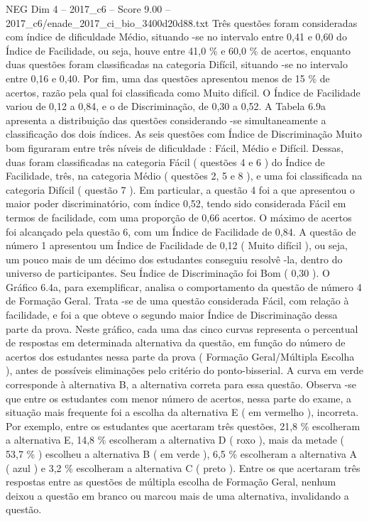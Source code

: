\begin{textsample}{NEG Dim 4 – 2017\_c6 – Score 9.00 – 2017\_c6/enade\_2017\_ci\_bio\_3400d20d88.txt}
Três questões foram consideradas com índice de dificuldade Médio, situando -se no intervalo entre 0,41 e 0,60 do Índice de Facilidade, ou seja, houve entre 41,0 \% e 60,0 \% de acertos, enquanto duas questões foram classificadas na categoria Difícil, situando -se no intervalo entre 0,16 e 0,40.
Por fim, uma das questões apresentou menos de 15 \% de acertos, razão pela qual foi classificada como Muito difícil.
O Índice de Facilidade variou de 0,12 a 0,84, e o de Discriminação, de 0,30 a 0,52.
A Tabela 6.9a apresenta a distribuição das questões considerando -se simultaneamente a classificação dos dois índices.
As seis questões com Índice de Discriminação Muito bom figuraram entre três níveis de dificuldade : Fácil, Médio e Difícil.
Dessas, duas foram classificadas na categoria Fácil ( questões 4 e 6 ) do Índice de Facilidade, três, na categoria Médio ( questões 2, 5 e 8 ), e uma foi classificada na categoria Difícil ( questão 7 ).
Em particular, a questão 4 foi a que apresentou o maior poder discriminatório, com índice 0,52, tendo sido considerada Fácil em termos de facilidade, com uma proporção de 0,66 acertos.
O máximo de acertos foi alcançado pela questão 6, com um Índice de Facilidade de 0,84.
A questão de número 1 apresentou um Índice de Facilidade de 0,12 ( Muito difícil ), ou seja, um pouco mais de um décimo dos estudantes conseguiu resolvê -la, dentro do universo de participantes.
Seu Índice de Discriminação foi Bom ( 0,30 ).
O Gráfico 6.4a, para exemplificar, analisa o comportamento da questão de número 4 de Formação Geral.
Trata -se de uma questão considerada Fácil, com relação à facilidade, e foi a que obteve o segundo maior Índice de Discriminação dessa parte da prova.
Neste gráfico, cada uma das cinco curvas representa o percentual de respostas em determinada alternativa da questão, em função do número de acertos dos estudantes nessa parte da prova ( Formação Geral/Múltipla Escolha ), antes de possíveis eliminações pelo critério do ponto-bisserial.
A curva em verde corresponde à alternativa B, a alternativa correta para essa questão.
Observa -se que entre os estudantes com menor número de acertos, nessa parte do exame, a situação mais frequente foi a escolha da alternativa E ( em vermelho ), incorreta.
Por exemplo, entre os estudantes que acertaram três questões, 21,8 \% escolheram a alternativa E, 14,8 \% escolheram a alternativa D ( roxo ), mais da metade ( 53,7 \% ) escolheu a alternativa B ( em verde ), 6,5 \% escolheram a alternativa A ( azul ) e 3,2 \% escolheram a alternativa C ( preto ).
Entre os que acertaram três respostas entre as questões de múltipla escolha de Formação Geral, nenhum deixou a questão em branco ou marcou mais de uma alternativa, invalidando a questão.

\end{textsample}
